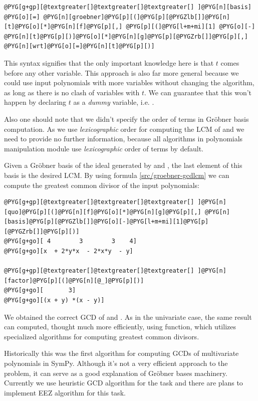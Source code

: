 \begin{Verbatim}[commandchars=@\[\]]
@PYG[g+gp][@textgreater[]@textgreater[]@textgreater[] ]@PYG[n][basis] @PYG[o][=] @PYG[n][groebner]@PYG[p][(]@PYG[p][@PYGZlb[]]@PYG[n][t]@PYG[o][*]@PYG[n][f]@PYG[p][,] @PYG[p][(]@PYG[l+m+mi][1] @PYG[o][-] @PYG[n][t]@PYG[p][)]@PYG[o][*]@PYG[n][g]@PYG[p][@PYGZrb[]]@PYG[p][,] @PYG[n][wrt]@PYG[o][=]@PYG[n][t]@PYG[p][)]
\end{Verbatim}
\noindent
This syntax signifies that the only important knowledge here is that $t$ comes before
any other variable. This approach is also far more general because we could use input
polynomials with more variables without changing the algorithm, as long as there is no
clash of variables with $t$. We can guarantee that this won't happen by declaring $t$
as a \emph{dummy} variable, i.e. .

Also one should note that we didn't specify the order of terms in Gröbner basis
computation. As we use \emph{lexicographic} order for computing the LCM of  and 
we need to provide no further information, because all algorithms in polynomials
manipulation module use \emph{lexicographic} order of terms by default.

Given a Gröbner basis of the ideal generated by  and , the last element
of this basis is the desired LCM. By using formula \eqref{src/groebner-gcdlcm} we can compute the
greatest common divisor of the input polynomials:

\begin{Verbatim}[commandchars=@\[\]]
@PYG[g+gp][@textgreater[]@textgreater[]@textgreater[] ]@PYG[n][quo]@PYG[p][(]@PYG[n][f]@PYG[o][*]@PYG[n][g]@PYG[p][,] @PYG[n][basis]@PYG[p][@PYGZlb[]]@PYG[o][-]@PYG[l+m+mi][1]@PYG[p][@PYGZrb[]]@PYG[p][)]
@PYG[g+go][ 4        3        3    4]
@PYG[g+go][x  + 2*y*x  - 2*x*y  - y]

@PYG[g+gp][@textgreater[]@textgreater[]@textgreater[] ]@PYG[n][factor]@PYG[p][(]@PYG[n][@_]@PYG[p][)]
@PYG[g+go][       3]
@PYG[g+go][(x + y) *(x - y)]
\end{Verbatim}
\noindent
We obtained the correct GCD of  and . As in the univariate case, the same
result can computed, thought much more efficiently, using  function, which
utilizes specialized algorithms for computing greatest common divisors.

Historically this was the first algorithm for computing GCDs of multivariate polynomials
in SymPy. Although it's not a very efficient approach to the problem, it can serve as a
good explanation of Gröbner bases machinery. Currently we use heuristic GCD algorithm
for the task and there are plans to implement EEZ algorithm for this task.


